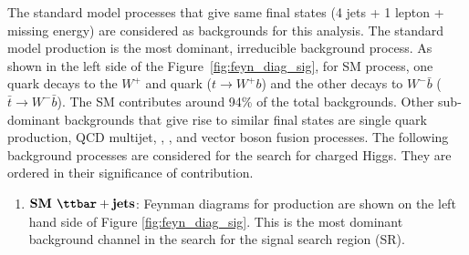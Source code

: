 The standard model processes that give same final states (4 jets + 1 
lepton + missing energy) are considered as backgrounds for this 
analysis. The standard model \ttbar production is the most dominant, 
irreducible background process. As shown in the left side of the 
Figure~\ref{fig:feyn_diag_sig}, for SM \ttbar process, one \PQt quark 
decays to the $W^+$ and \PQb quark ($t\rightarrow W^+ b$) and the 
other decays to $W^- \bar{b}$ ($\bar{t}\rightarrow W^-\bar{b}$). The 
SM \ttbar contributes around 94\% of the total backgrounds. Other 
sub-dominant backgrounds that give rise to similar final states are 
single \PQt quark production, QCD multijet, \wjets, \dyjets, and 
vector boson fusion processes. The following background processes are 
considered for the search for charged Higgs. They are ordered in their 
significance of contribution.
\begin{enumerate}
\item $\textbf{SM \ttjets}$: Feynman diagrams 
	for \ttjets production are shown on the left hand side of Figure
	\ref{fig:feyn_diag_sig}. This is the most dominant background channel
	in the search for the signal search region (SR).


\end{enumerate}
